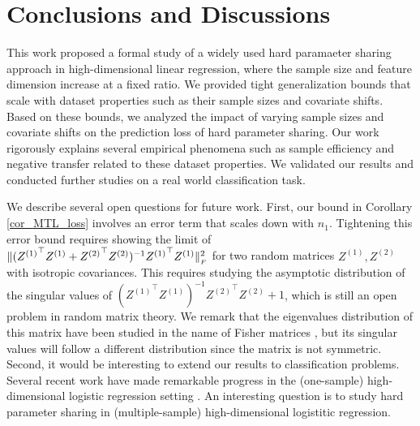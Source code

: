 \section{Conclusions and Discussions}\label{sec_conclude}

This work proposed a formal study of a widely used hard paramaeter sharing approach in high-dimensional linear regression, where the sample size and feature dimension increase at a fixed ratio.
We provided tight generalization bounds that scale with dataset properties such as their sample sizes and covariate shifts.
Based on these bounds, we analyzed the impact of varying sample sizes and covariate shifts on the prediction loss of hard parameter sharing.
Our work rigorously explains several empirical phenomena such as sample efficiency and negative transfer related to these dataset properties.
We validated our results and conducted further studies on a real world classification task.

We describe several open questions for future work.
First, our bound in Corollary \ref{cor_MTL_loss} involves an error term that scales down with $n_1$.
Tightening this error bound requires showing the limit of $\|({Z^{(1)}}^{\top} Z^{(1)} + {Z^{(2)}}^{\top} Z^{(2)})^{-1} {Z^{(1)}}^{\top} Z^{(1)}\|_{_{F}}^2$ for two random matrices $Z^{(1)}, Z^{(2)}$ with isotropic covariances.
This requires studying the asymptotic distribution of the singular values of $({Z^{(1)}}^{\top} Z^{(1)})^{-1}{Z^{(2)}}^{\top} Z^{(2)} + 1$, which is still an open problem in random matrix theory. We remark that the eigenvalues distribution of this matrix have been studied in the name of Fisher matrices \cite{Fmatrix}, but its singular values will follow a different distribution since the matrix is not symmetric.
Second, it would be interesting to extend our results to classification problems.
Several recent work have made remarkable progress in the (one-sample) high-dimensional logistic regression setting \cite{sur2019modern}.
An interesting question is to study hard parameter sharing in (multiple-sample) high-dimensional logistitic regression.
